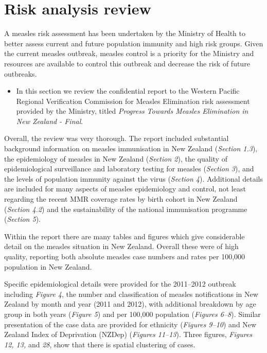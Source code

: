\documentclass{article}
\begin{document}
\section{Risk analysis review}

A measles risk assessment has been undertaken by the Ministry of Health to better assess current and future population immunity and high risk groups. Given the current measles outbreak, measles control is a priority for the Ministry and resources are available to control this outbreak and decrease the risk of future outbreaks.
\begin{itemize}
\item In this section we review the confidential report to the Western Pacific Regional Verification Commission for Measles Elimination risk assessment provided by the Ministry, titled \emph {Progress Towards Measles Elimination in New Zealand - Final}.
\end{itemize}

Overall, the review was very thorough. The report included substantial background information on measles immunisation in New Zealand (\emph{Section 1.3}), the epidemiology of measles in New Zealand (\emph{Section 2}), the quality of epidemiological surveillance and laboratory testing for measles (\emph{Section 3}), and the levels of population immunity against the virus (\emph{Section 4}). Additional details are included for many aspects of measles epidemiology and control, not least regarding the recent MMR coverage rates by birth cohort in New Zealand (\emph{Section 4.2}) and the sustainability of the national immunisation programme (\emph{Section 5}).

Within the report there are many tables and figures which give considerable detail on the measles situation in New Zealand. Overall these were of high quality, reporting both absolute measles case numbers and rates per 100,000 population in New Zealand.

Specific epidemiological details were provided for the 2011--2012 outbreak including \emph{Figure 4}, the number and classification of measles notifications in New Zealand by month and year (2011 and 2012), with additional breakdown by age group in both years (\emph{Figure 5}) and per 100,000 population (\emph{Figures 6--8}). Similar presentation of the case data are provided for ethnicity (\emph{Figures 9--10}) and New Zealand Index of Deprivation (NZDep) (\emph{Figures 11--13}). Three figures, \emph{Figures 12, 13,} and \emph{28}, show that there is spatial clustering of cases.
\end{document}
